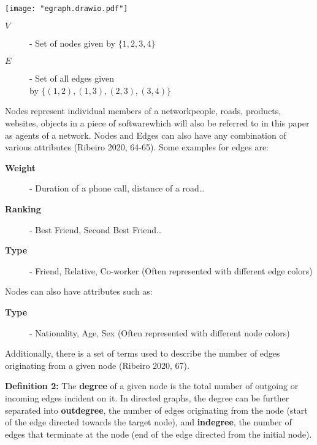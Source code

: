 \documentclass{article}
\begin{document}
\noindent\begin{minipage}{.5\textwidth}
\centering
\texttt{[image: "egraph.drawio.pdf"]}
\label{fig:fig21}            
\end{minipage}%
\begin{minipage}{.5\textwidth}
\centering

\begin{description}
  \item[\textbf{$V$}] - Set of nodes given by $\{1, 2, 3, 4\}$
  \item[\textbf{$E$}] - Set of all edges given \\by $\{(1, 2), (1, 3), (2, 3), (3, 4)\}$
\end{description}


\label{fig:fig22}            
\end{minipage}

\bigskip

\noindent Nodes represent individual members of a network\textemdash people, roads, products, websites, objects in a piece of software\textemdash which will also be referred to in this paper as agents of a network. 
Nodes and Edges can also have any combination of various attributes (Ribeiro 2020, 64-65). Some examples for edges are:

\bigskip
\indent \begin{description}
  \item[\textbf{Weight}] - Duration of a phone call, distance of a road\dots
  \item[\textbf{Ranking}] - Best Friend, Second Best Friend\dots
  \item[\textbf{Type}] - Friend, Relative, Co-worker (Often represented with different edge colors)  
\end{description}

\bigskip

\noindent Nodes can also have attributes such as:
\bigskip
\begin{description}
  \item[\textbf{Type}] - Nationality, Age, Sex (Often represented with different node colors)
\end{description}
\bigskip

Additionally, there is a set of terms used to describe the number of edges originating from a given node (Ribeiro 2020, 67).

\bigskip

\textbf{Definition 2:} The \textbf{degree} of a given node is the total number of outgoing or incoming edges incident on it. 
In directed graphs, the degree can be further separated into \textbf{outdegree}, the number of edges originating from the node (start of the edge directed towards the target node), and \textbf{indegree},
the number of edges that terminate at the node (end of the edge directed from the initial node).
\end{document}

